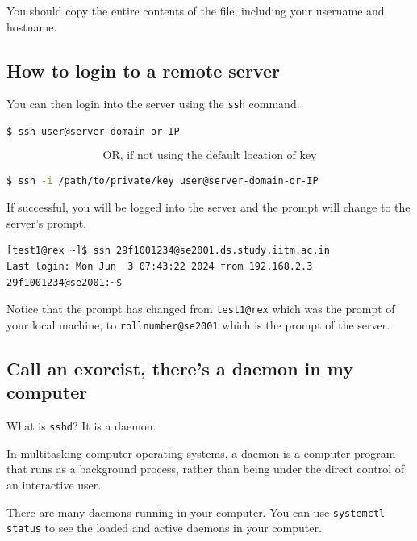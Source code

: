 You should copy the entire contents of the file, including
your username and hostname.

\subsection{How to login to a remote server}

You can then login into the server using the \lstinline|ssh|
command.

\begin{lstlisting}[language=bash]
$ ssh user@server-domain-or-IP
\end{lstlisting}

\[
  \text{OR, if not using the default location of key}
\]

\begin{lstlisting}[language=bash]
$ ssh -i /path/to/private/key user@server-domain-or-IP
\end{lstlisting}

If successful, you will be logged into the server
and the prompt will change to the server's prompt.

\begin{lstlisting}[language=bash]
[test1@rex ~]$ ssh 29f1001234@se2001.ds.study.iitm.ac.in
Last login: Mon Jun  3 07:43:22 2024 from 192.168.2.3
29f1001234@se2001:~$
\end{lstlisting}

Notice that the prompt has changed from \lstinline|test1@rex|
which was the prompt of your local machine, to
\lstinline|rollnumber@se2001| which is the prompt of the
server.

\subsection{Call an exorcist, there's a daemon in my computer}

What is \lstinline|sshd|?
It is a daemon.

\begin{definition}[Daemon]
  In multitasking computer operating systems, a daemon
  is a computer program that runs as a background process,
  rather than being under the direct control of an
  interactive user.
\end{definition}

There are many daemons running in your computer.
You can use \lstinline|systemctl status| to see the
loaded and active daemons in your computer.

